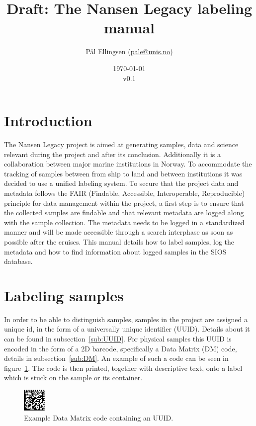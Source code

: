\documentclass[a4paper,english, 11pt]{article}
\title{Draft: The Nansen Legacy labeling manual}
\date{\today\\v0.1}
\author{Pål Ellingsen (\url{pale@unis.no})}
\begin{document}
\maketitle
\tableofcontents
\section{Introduction} %
\label{sec:Introduction}

The Nansen Legacy project is aimed at generating samples, data and science relevant during the project and after its conclusion. Additionally it is a collaboration between major marine institutions in Norway. To accommodate the tracking of samples between from ship to land and  between institutions it was decided to use a unified labeling system. To secure that the project data and metadata follows the FAIR (Findable, Accessible, Interoperable, Reproducible) principle for data management within the project, a first step is to ensure that the collected samples are findable and that relevant metadata are logged
along with the sample collection. The metadata needs to be logged in a standardized manner and will be
made accessible through a search interphase as soon as possible after the cruises.  This manual details how to label samples, log the metadata and how to find information about logged samples in the SIOS database.  


\section{Labeling samples} %
\label{sec:Labeling samples}



In order to be able to distinguish samples, samples in the project are assigned a unique id, in the form of a universally unique identifier (UUID). Details about it can be found in subsection~\ref{sub:UUID}. For physical samples this UUID is encoded in the form of a 2D barcode, specifically a Data Matrix (DM) code, details in subsection~\ref{sub:DM}. An example of such a code can be seen in figure~\ref{fig:data_matrix}. The code is then printed, together with descriptive text, onto a label which is stuck on the sample or its container.

\begin{figure}[htb]
    \centering
    \includegraphics[width=0.1\textwidth]{Data_matrix.png}
    \caption{\label{fig:data_matrix}
        Example Data Matrix code containing an UUID.
    }
\end{figure}
\end{document}
